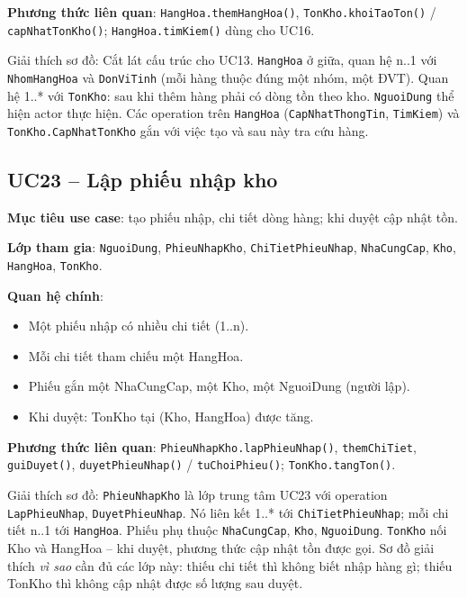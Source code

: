 \textbf{Phương thức liên quan}: \texttt{HangHoa.themHangHoa()}, \texttt{TonKho.khoiTaoTon()} / \texttt{capNhatTonKho()}; \texttt{HangHoa.timKiem()} dùng cho UC16.



Giải thích sơ đồ: Cắt lát cấu trúc cho UC13. \texttt{HangHoa} ở giữa, quan hệ n..1 với \texttt{NhomHangHoa} và \texttt{DonViTinh} (mỗi hàng thuộc đúng một nhóm, một ĐVT). Quan hệ 1..* với \texttt{TonKho}: sau khi thêm hàng phải có dòng tồn theo kho. \texttt{NguoiDung} thể hiện actor thực hiện. Các operation trên \texttt{HangHoa} (\texttt{CapNhatThongTin}, \texttt{TimKiem}) và \texttt{TonKho.CapNhatTonKho} gắn với việc tạo và sau này tra cứu hàng.

\subsection{UC23 -- Lập phiếu nhập kho}

\textbf{Mục tiêu use case}: tạo phiếu nhập, chi tiết dòng hàng; khi duyệt cập nhật tồn.

\textbf{Lớp tham gia}: \texttt{NguoiDung}, \texttt{PhieuNhapKho}, \texttt{ChiTietPhieuNhap}, \texttt{NhaCungCap}, \texttt{Kho}, \texttt{HangHoa}, \texttt{TonKho}.

\textbf{Quan hệ chính}:
\begin{itemize}[leftmargin=1.5cm]
    \item Một phiếu nhập có nhiều chi tiết (1..n).
    \item Mỗi chi tiết tham chiếu một HangHoa.
    \item Phiếu gắn một NhaCungCap, một Kho, một NguoiDung (người lập).
    \item Khi duyệt: TonKho tại (Kho, HangHoa) được tăng.
\end{itemize}

\textbf{Phương thức liên quan}: \texttt{PhieuNhapKho.lapPhieuNhap()}, \texttt{themChiTiet}, \texttt{guiDuyet()}, \texttt{duyetPhieuNhap()} / \texttt{tuChoiPhieu()}; \texttt{TonKho.tangTon()}.



Giải thích sơ đồ: \texttt{PhieuNhapKho} là lớp trung tâm UC23 với operation \texttt{LapPhieuNhap}, \texttt{DuyetPhieuNhap}. Nó liên kết 1..* tới \texttt{ChiTietPhieuNhap}; mỗi chi tiết n..1 tới \texttt{HangHoa}. Phiếu phụ thuộc \texttt{NhaCungCap}, \texttt{Kho}, \texttt{NguoiDung}. \texttt{TonKho} nối Kho và HangHoa -- khi duyệt, phương thức cập nhật tồn được gọi. Sơ đồ giải thích \textit{vì sao} cần đủ các lớp này: thiếu chi tiết thì không biết nhập hàng gì; thiếu TonKho thì không cập nhật được số lượng sau duyệt.

